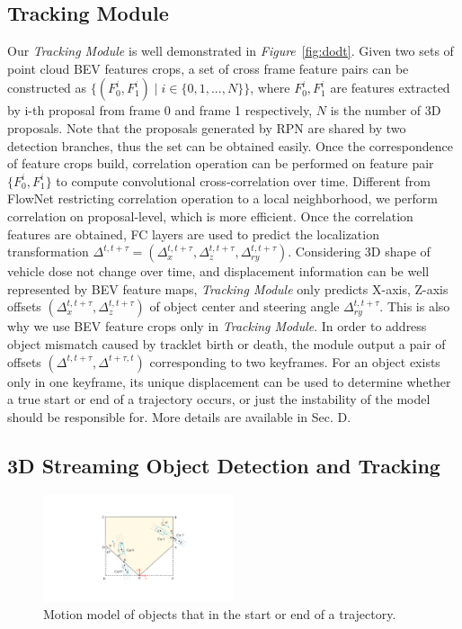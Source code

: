 \documentclass[letterpaper, 10 pt, conference]{ieeeconf}  %
\def\figurename{\emph{Figure}}
\begin{document}
\subsection{Tracking Module}
Our \textit{Tracking Module} is well demonstrated in \figurename \, \ref{fig:dodt}. Given two sets of point cloud BEV features crops, a set of cross frame feature pairs can be constructed as $\{(F_0^i, F_1^i)\mid i \in \{0,1,...,N\}\}$, where $F_0^i, F_1^i$ are features extracted by i-th proposal from frame 0 and frame 1 respectively, $N$ is the number of 3D proposals. Note that the proposals generated by RPN are shared by two detection branches, thus the set can be obtained easily. Once the correspondence of feature crops build, correlation operation can be performed on feature pair $\{F_0^i, F_1^i\}$ to compute convolutional cross-correlation over time. Different from FlowNet \cite{dosovitskiy2015flownet} restricting correlation operation to a local neighborhood, we perform correlation on proposal-level, which is more efficient. Once the correlation features are obtained, FC layers are used to predict the localization transformation $\Delta^{t, t+\tau} = (\Delta^{t,t+\tau}_{x}, \Delta^{t,t+\tau}_{z}, \Delta^{t,t+\tau}_{ry})$. Considering 3D shape of vehicle dose not change over time, and displacement information can be well represented by BEV feature maps, \textit{Tracking Module} only predicts X-axis, Z-axis offsets $(\Delta^{t,t+\tau}_{x}, \Delta^{t,t+\tau}_{z})$ of object center and steering angle  $\Delta^{t,t+\tau}_{ry}$. This is also why we use BEV feature crops only in \textit{Tracking Module}. In order to address object mismatch caused by tracklet birth or death, the module output a pair of offsets $(\Delta^{t, t+\tau},\Delta^{ t+\tau, t})$ corresponding to two keyframes. For an object exists only in one keyframe, its unique displacement can be used to determine whether a true start or end of a trajectory occurs, or just the instability of the model should be responsible for. More details are available in Sec. D.

\subsection{3D Streaming Object Detection and Tracking}
\begin{figure}
	\vspace{-0.6cm}
	\rule{0pt}{1ex}
	\begin{center}
		\includegraphics[trim={10cm, 4cm, 8cm, 3.5cm}, clip, width=0.5\textwidth]{images/motion.pdf}
	\end{center}
	\caption{Motion model of objects that in the start or end of a trajectory.}
	\label{fig:motion}
\end{figure}
\end{document}

